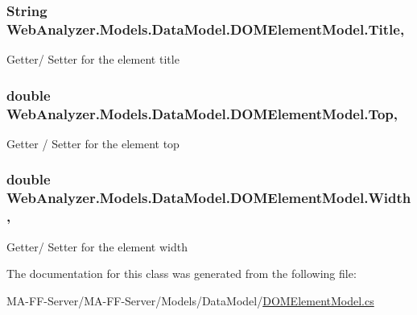 \subsubsection[{Title}]{\setlength{\rightskip}{0pt plus 5cm}String Web\+Analyzer.\+Models.\+Data\+Model.\+D\+O\+M\+Element\+Model.\+Title\hspace{0.3cm}{\ttfamily [get]}, {\ttfamily [set]}}\label{class_web_analyzer_1_1_models_1_1_data_model_1_1_d_o_m_element_model_a10a1c3ec9fceca5b4745cae7f9647c74}


Getter/ Setter for the element title 

\hypertarget{class_web_analyzer_1_1_models_1_1_data_model_1_1_d_o_m_element_model_a1f17dcaf6e924292f3b6a8ade726941d}{}
\subsubsection[{Top}]{\setlength{\rightskip}{0pt plus 5cm}double Web\+Analyzer.\+Models.\+Data\+Model.\+D\+O\+M\+Element\+Model.\+Top\hspace{0.3cm}{\ttfamily [get]}, {\ttfamily [set]}}\label{class_web_analyzer_1_1_models_1_1_data_model_1_1_d_o_m_element_model_a1f17dcaf6e924292f3b6a8ade726941d}


Getter / Setter for the element top 

\hypertarget{class_web_analyzer_1_1_models_1_1_data_model_1_1_d_o_m_element_model_a34aa9812237c151017294753a8ee77a7}{}
\subsubsection[{Width}]{\setlength{\rightskip}{0pt plus 5cm}double Web\+Analyzer.\+Models.\+Data\+Model.\+D\+O\+M\+Element\+Model.\+Width\hspace{0.3cm}{\ttfamily [get]}, {\ttfamily [set]}}\label{class_web_analyzer_1_1_models_1_1_data_model_1_1_d_o_m_element_model_a34aa9812237c151017294753a8ee77a7}


Getter/ Setter for the element width 



The documentation for this class was generated from the following file\+:\begin{DoxyCompactItemize}
\item 
M\+A-\/\+F\+F-\/\+Server/\+M\+A-\/\+F\+F-\/\+Server/\+Models/\+Data\+Model/\hyperlink{_d_o_m_element_model_8cs}{D\+O\+M\+Element\+Model.\+cs}\end{DoxyCompactItemize}
